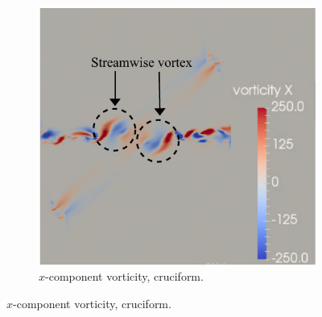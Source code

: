 \documentclass[oneside]{utmthesis}
\begin{document}
\begin{figure} \continuedfloat
  \centering
  \begin{subfigure}[h]{0.6\textwidth}
    \centering
    \includegraphics[width=\textwidth]{figs/vorx45}
    \caption{$x$-component vorticity, \angth{} cruciform.}
    \label{fig:vorx45}
  \end{subfigure}


\end{figure}
\end{document}
